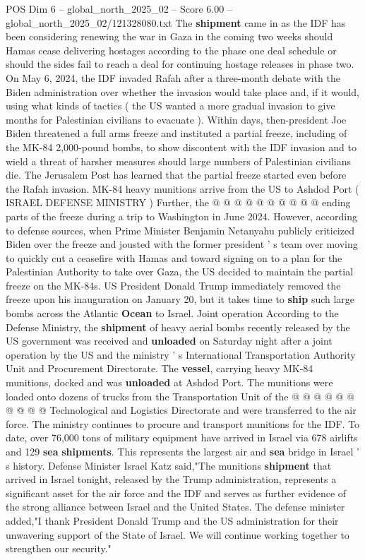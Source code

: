 \begin{textsample}{POS Dim 6 – global\_north\_2025\_02 – Score 6.00 – global\_north\_2025\_02/121328080.txt}  \label{ex:f6_pos_361}
The \textbf{shipment} came in as the IDF has been considering renewing the war in Gaza in the coming two weeks should Hamas cease delivering hostages according to the phase one deal schedule or should the sides fail to reach a deal for continuing hostage releases in phase two.
On May 6, 2024, the IDF invaded Rafah after a three-month debate with the Biden administration over whether the invasion would take place and, if it would, using what kinds of tactics ( the US wanted a more gradual invasion to give months for Palestinian civilians to evacuate ).
Within days, then-president Joe Biden threatened a full arms freeze and instituted a partial freeze, including of the MK-84 2,000-pound bombs, to show discontent with the IDF invasion and to wield a threat of harsher measures should large numbers of Palestinian civilians die.
The Jerusalem Post has learned that the partial freeze started even before the Rafah invasion.
MK-84 heavy munitions arrive from the US to Ashdod Port ( ISRAEL DEFENSE MINISTRY ) Further, the @ @ @ @ @ @ @ @ @ @ ending parts of the freeze during a trip to Washington in June 2024.
However, according to defense sources, when Prime Minister Benjamin Netanyahu publicly criticized Biden over the freeze and jousted with the former president ' s team over moving to quickly cut a ceasefire with Hamas and toward signing on to a plan for the Palestinian Authority to take over Gaza, the US decided to maintain the partial freeze on the MK-84s.
US President Donald Trump immediately removed the freeze upon his inauguration on January 20, but it takes time to \textbf{ship} such large bombs across the Atlantic \textbf{Ocean} to Israel.
Joint operation According to the Defense Ministry, the \textbf{shipment} of heavy aerial bombs recently released by the US government was received and \textbf{unloaded} on Saturday night after a joint operation by the US and the ministry ' s International Transportation Authority Unit and Procurement Directorate.
The \textbf{vessel}, carrying heavy MK-84 munitions, docked and was \textbf{unloaded} at Ashdod Port.
The munitions were loaded onto dozens of trucks from the Transportation Unit of the @ @ @ @ @ @ @ @ @ @ Technological and Logistics Directorate and were transferred to the air force.
The ministry continues to procure and transport munitions for the IDF.
To date, over 76,000 tons of military equipment have arrived in Israel via 678 airlifts and 129 \textbf{sea} \textbf{shipments}.
This represents the largest air and \textbf{sea} bridge in Israel ' s history.
Defense Minister Israel Katz said,"The munitions \textbf{shipment} that arrived in Israel tonight, released by the Trump administration, represents a significant asset for the air force and the IDF and serves as further evidence of the strong alliance between Israel and the United States.
The defense minister added,"I thank President Donald Trump and the US administration for their unwavering support of the State of Israel.
We will continue working together to strengthen our security."

\end{textsample}
